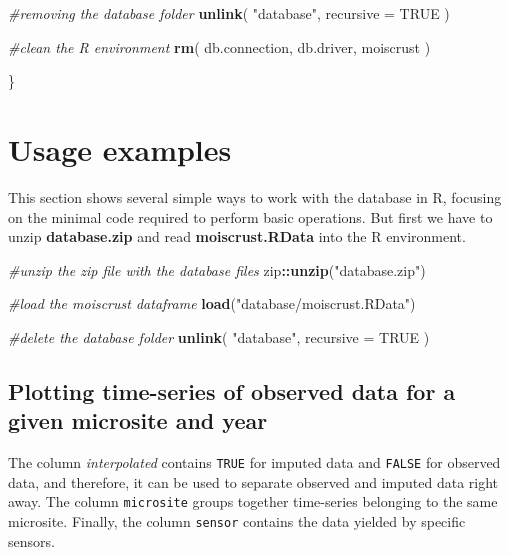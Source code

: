 \documentclass[]{article}
\newenvironment{Shaded}{\begin{snugshade}}{\end{snugshade}}
\newcommand{\CommentTok}[1]{\textcolor[rgb]{0.56,0.35,0.01}{\textit{#1}}}
\newcommand{\DataTypeTok}[1]{\textcolor[rgb]{0.13,0.29,0.53}{#1}}
\newcommand{\KeywordTok}[1]{\textcolor[rgb]{0.13,0.29,0.53}{\textbf{#1}}}
\newcommand{\NormalTok}[1]{#1}
\newcommand{\OperatorTok}[1]{\textcolor[rgb]{0.81,0.36,0.00}{\textbf{#1}}}
\newcommand{\OtherTok}[1]{\textcolor[rgb]{0.56,0.35,0.01}{#1}}
\newcommand{\StringTok}[1]{\textcolor[rgb]{0.31,0.60,0.02}{#1}}
\begin{document}
\begin{Shaded}
\begin{Highlighting}[]
  \CommentTok{#removing the database folder}
  \KeywordTok{unlink}\NormalTok{(}
    \StringTok{"database"}\NormalTok{, }
    \DataTypeTok{recursive =} \OtherTok{TRUE}
\NormalTok{    )}
  
  \CommentTok{#clean the R environment}
  \KeywordTok{rm}\NormalTok{(}
\NormalTok{    db.connection,}
\NormalTok{    db.driver,}
\NormalTok{    moiscrust}
\NormalTok{    )}
  
\NormalTok{\}}
\end{Highlighting}
\end{Shaded}

\hypertarget{usage-examples}{%
\section{Usage examples}\label{usage-examples}}

This section shows several simple ways to work with the database in R,
focusing on the minimal code required to perform basic operations. But
first we have to unzip \textbf{database.zip} and read
\textbf{moiscrust.RData} into the R environment.

\begin{Shaded}
\begin{Highlighting}[]
\CommentTok{#unzip the zip file with the database files}
\NormalTok{zip}\OperatorTok{::}\KeywordTok{unzip}\NormalTok{(}\StringTok{"database.zip"}\NormalTok{)}

\CommentTok{#load the moiscrust dataframe}
\KeywordTok{load}\NormalTok{(}\StringTok{"database/moiscrust.RData"}\NormalTok{)}

\CommentTok{#delete the database folder}
  \KeywordTok{unlink}\NormalTok{(}
    \StringTok{"database"}\NormalTok{, }
    \DataTypeTok{recursive =} \OtherTok{TRUE}
\NormalTok{    )}
\end{Highlighting}
\end{Shaded}

\hypertarget{plotting-time-series-of-observed-data-for-a-given-microsite-and-year}{%
\subsection{Plotting time-series of observed data for a given microsite
and
year}\label{plotting-time-series-of-observed-data-for-a-given-microsite-and-year}}

The column \emph{interpolated} contains \texttt{TRUE} for imputed data
and \texttt{FALSE} for observed data, and therefore, it can be used to
separate observed and imputed data right away. The column
\texttt{microsite} groups together time-series belonging to the same
microsite. Finally, the column \texttt{sensor} contains the data yielded
by specific sensors.
\end{document}
